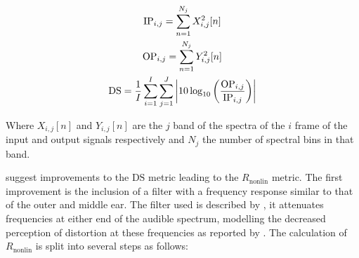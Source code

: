 			\begin{gather}
				\mathrm{IP}_{i,j} = \sum_{n = 1}^{N_{j}} X_{i,j}^{2}[n] \nonumber \\
				\mathrm{OP}_{i,j} = \sum_{n = 1}^{N_{j}} Y_{i,j}^{2}[n] \nonumber \\
				\mathrm{DS} = \frac{1}{I} \sum_{i = 1}^{I} \sum_{j = 1}^{J} 
					\left|10\log_{10} \left( \frac{\mathrm{OP}_{i,j}}{\mathrm{IP}_{i,j}} \right) \right|
				\label{eq:DistortionScore}
			\end{gather}

			Where $X_{i,j}[n]$ and $Y_{i,j}[n]$ are the $j$ band of the spectra of the $i$
			frame of the input and output signals respectively and $N_{j}$ the number of spectral bins in that
			band.
			
			\citet{tan2004predicting} suggest improvements to the $\mathrm{DS}$ metric leading to the
			$R_{\mathrm{nonlin}}$ metric. The first improvement is the inclusion of a filter with a frequency
			response similar to that of the outer and middle ear. The filter used is described by
			\citet{glasberg2002a}, it attenuates frequencies at either end of the audible spectrum, modelling
			the decreased perception of distortion at these frequencies as reported by
			\citet{voishvillo2006assessment}. The calculation of $R_{\mathrm{nonlin}}$ is split into several
			steps as follows:
			
